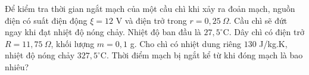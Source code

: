 \begin{ex}
Để kiểm tra thời gian ngắt mạch của một cầu chì khi xảy ra đoản mạch, nguồn điện có suất điện động $\xi=12$ V và điện trở trong $r=0,25\ \Omega$. Cầu chì sẽ đứt ngay khi đạt nhiệt độ nóng chảy. Nhiệt độ ban đầu là $27,5^\circ\mathrm{C}$. Dây chì có điện trở $R=11,75\ \Omega$, khối lượng $m=0,1$ g. Cho chì có nhiệt dung riêng $130$ J/kg.K, nhiệt độ nóng chảy $327,5^\circ\mathrm{C}$. Thời điểm mạch bị ngắt kể từ khi đóng mạch là bao nhiêu?
\loigiai{\[I=\frac{\xi}{R+r}=\frac{12}{11,75+0,25}=1\ \mathrm{A}.\]
\[P=I^2R=11,75\ \mathrm{W}.\]
\[m=0,1\ \mathrm{g}=10^{-4}\ \mathrm{kg},\qquad \Delta T=327,5-27,5=300\ \mathrm{K}.\]
\[Q=mc\Delta T=10^{-4}\cdot130\cdot300=3,9\ \mathrm{J}.\]
\[t=\frac{Q}{P}=\frac{3,9}{11,75}\approx0,33\ \mathrm{s}.\]}
\end{ex}
